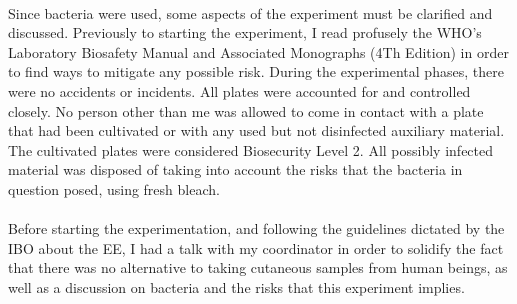 \paragraph{}Since bacteria were used, some aspects of the experiment must be clarified and discussed. Previously to starting the experiment, I read profusely the WHO's Laboratory Biosafety Manual and Associated Monographs (4Th Edition)\cite{worldhealthorganizationLaboratoryBiosafetyManual2020} in order to find ways to mitigate any possible risk. During the experimental phases, there were no accidents or incidents. All plates were accounted for and controlled closely. No person other than me was allowed to come in contact with a plate that had been cultivated or with any used but not disinfected auxiliary material. The cultivated plates were considered Biosecurity Level 2. All possibly infected material was disposed of taking into account the risks that the bacteria in question posed, using fresh bleach.
\paragraph{}Before starting the experimentation, and following the guidelines dictated by the IBO about the EE, I had a talk with my coordinator in order to solidify the fact that there was no alternative to taking cutaneous samples from human beings, as well as a discussion on bacteria and the risks that this experiment implies.
